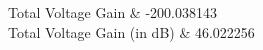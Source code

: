 
Total Voltage Gain     &  -200.038143   \\ \hline
Total Voltage Gain (in dB)   &  46.022256   \\ \hline